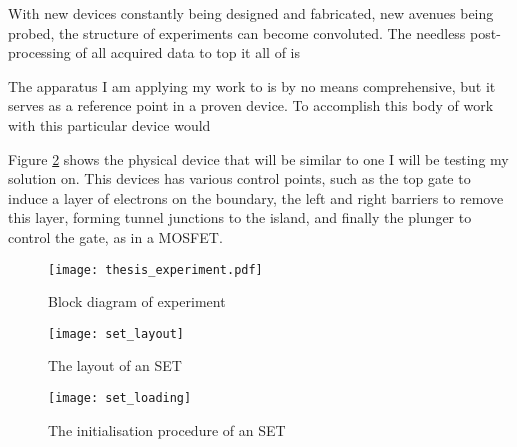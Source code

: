 With new devices constantly being designed and fabricated, new avenues being probed, the structure of experiments can become convoluted. The needless post-processing of all acquired data to top it all of is 


The apparatus I am applying my work to is by no means comprehensive, but it serves as a reference point in a proven device. To accomplish this body of work with this particular device would 


Figure \ref{fig::set_layout} shows the physical device that will be similar to one I will be testing my solution on. This devices has various control points, such as the top gate to induce a layer of electrons on the boundary, the left and right barriers to remove this layer, forming tunnel junctions to the island, and finally the plunger to control the gate, as in a MOSFET.

\begin{figure}[htbp!]
	\centering
	\texttt{[image: thesis\_experiment.pdf]}
	\caption{Block diagram of experiment}
	\label{fig::thesis_experiment}
\end{figure}

\begin{figure}[htbp!]
	\centering
	\texttt{[image: set\_layout]}
	\caption{The layout of an SET}
	\label{fig::set_layout}
\end{figure}

\begin{figure}[htbp!]
	\centering
	\texttt{[image: set\_loading]}
	\caption{The initialisation procedure of an SET}
	\label{fig::set_loading}
\end{figure}